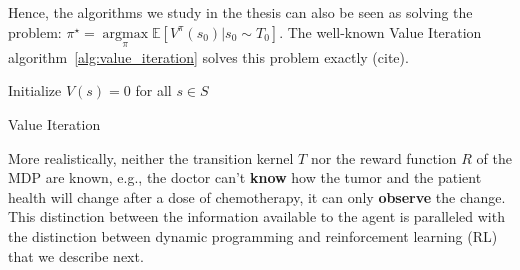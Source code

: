 Hence, the algorithms we study in the thesis can also be seen as solving the problem: $\pi^{\star} = \underset{\pi}{\operatorname{argmax}}\mathbb{E}\left[V^{\pi}(s_0)|s_0\sim T_0 \right]$. The well-known Value Iteration algorithm~\ref{alg:value_iteration} solves this problem exactly (cite). 

\begin{algorithm}
    Initialize $V(s) = 0$ for all $s \in S$ \\
    \caption{Value Iteration}\label{alg:value_iteration}
\end{algorithm}

More realistically, neither the transition kernel $T$ nor the reward function $R$ of the MDP are known, e.g., the doctor can't \textbf{know} how the tumor and the patient health will change after a dose of chemotherapy, it can only \textbf{observe} the change. This distinction between the information available to the agent is paralleled with the distinction between dynamic programming and reinforcement learning (RL) that we describe next. 

